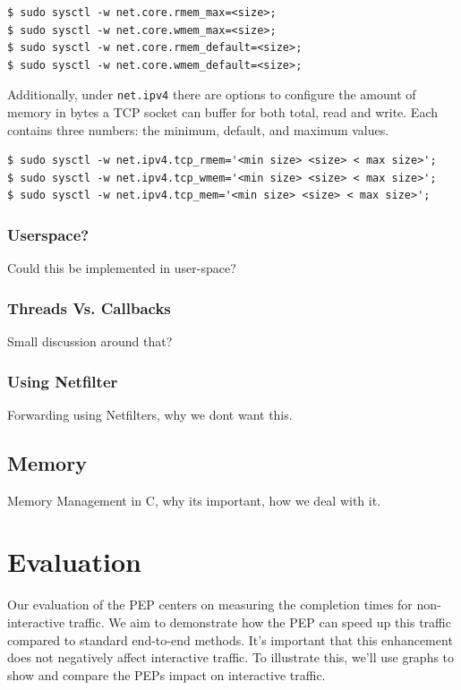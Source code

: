 \documentclass[a4paper,english, 11pt]{report}
\begin{document}
\begin{verbatim}
$ sudo sysctl -w net.core.rmem_max=<size>;
$ sudo sysctl -w net.core.wmem_max=<size>;
$ sudo sysctl -w net.core.rmem_default=<size>;
$ sudo sysctl -w net.core.wmem_default=<size>;
\end{verbatim}

Additionally, under \verb|net.ipv4| there are options to configure the amount of memory in bytes a TCP socket can buffer for both total, read and write. Each contains three numbers: the minimum, default, and maximum values.


\begin{verbatim}
$ sudo sysctl -w net.ipv4.tcp_rmem='<min size> <size> < max size>';
$ sudo sysctl -w net.ipv4.tcp_wmem='<min size> <size> < max size>';
$ sudo sysctl -w net.ipv4.tcp_mem='<min size> <size> < max size>';
\end{verbatim}

\subsection{Userspace?}
Could this be implemented in user-space?

\subsection{Threads Vs. Callbacks}
Small discussion around that?


\subsection{Using Netfilter}
Forwarding using Netfilters, why we dont want this.


\section{Memory}
Memory Management in C, why its important, how we deal with it.

\chapter{Evaluation}
Our evaluation of the PEP centers on measuring the completion times for non-interactive traffic. We aim to demonstrate how the PEP can speed up this traffic compared to standard end-to-end methods. It's important that this enhancement does not negatively affect interactive traffic. To illustrate this, we'll use graphs to show and compare the PEPs impact on interactive traffic.
\end{document}

